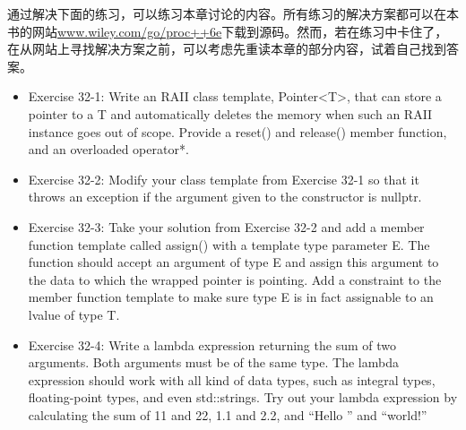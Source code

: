 通过解决下面的练习，可以练习本章讨论的内容。所有练习的解决方案都可以在本书的网站\url{www.wiley.com/go/proc++6e}下载到源码。然而，若在练习中卡住了，在从网站上寻找解决方案之前，可以考虑先重读本章的部分内容，试着自己找到答案。

\begin{itemize}
\item
Exercise 32-1: Write an RAII class template, Pointer<T>, that can store a pointer to a T and automatically deletes the memory when such an RAII instance goes out of scope. Provide a reset() and release() member function, and an overloaded operator*.

\item
Exercise 32-2: Modify your class template from Exercise 32-1 so that it throws an exception if the argument given to the constructor is nullptr.

\item
Exercise 32-3: Take your solution from Exercise 32-2 and add a member function template called assign() with a template type parameter E. The function should accept an argument of type E and assign this argument to the data to which the wrapped pointer is pointing. Add a constraint to the member function template to make sure type E is in fact assignable to an lvalue of type T.

\item
Exercise 32-4: Write a lambda expression returning the sum of two arguments. Both arguments must be of the same type. The lambda expression should work with all kind of data types, such as integral types, floating-point types, and even std::strings. Try out your lambda expression by calculating the sum of 11 and 22, 1.1 and 2.2, and “Hello ” and “world!”
\end{itemize}
